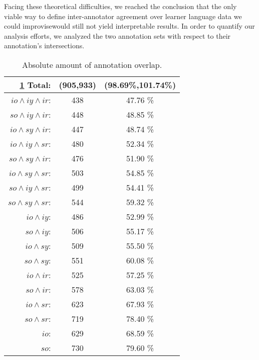 \documentclass[12pt]{article}
\begin{document}
Facing these theoretical difficulties, we reached the conclusion that the only
viable way to define inter-annotator agreement over learner language data
we could improvise\footnotemark would still not yield interpretable results. In
order to quantify our analysis efforts, we analyzed the two annotation sets with
respect to their annotation's intersections.


\begin{table}
  \centering
\begin{tabular}{r|c|c}\ref{tab:1}
  Total: & (905,933)& (98.69\%,101.74\%)\\\hline
  $io \wedge iy \wedge ir$:& 438 & 47.76 \%\\
  $so \wedge iy \wedge ir$:& 448 & 48.85 \%\\
  $io \wedge sy \wedge ir$:& 447 & 48.74 \%\\
  $io \wedge iy \wedge sr$:& 480 & 52.34 \%\\
  $so \wedge sy \wedge ir$:& 476 & 51.90 \%\\
  $io \wedge sy \wedge sr$:& 503 & 54.85 \%\\
  $so \wedge iy \wedge sr$:& 499 & 54.41 \%\\
  $so \wedge sy \wedge sr$:& 544 & 59.32 \%\\
  $     io \wedge iy$:& 486      & 52.99 \%\\
  $     so \wedge iy$:& 506      & 55.17 \%\\
  $     io \wedge sy$:& 509      & 55.50 \%\\
  $     so \wedge sy$:& 551      & 60.08 \%\\
  $     io \wedge ir$:& 525      & 57.25 \%\\
  $     so \wedge ir$:& 578      & 63.03 \%\\
  $     io \wedge sr$:& 623      & 67.93 \%\\
  $     so \wedge sr$:& 719      & 78.40 \%\\
  $          io$:& 629           & 68.59 \%\\
  $          so$:& 730           & 79.60 \%\\
\end{tabular}
\caption{Absolute amount of annotation overlap.}\label{tab:1}

\end{table}
\end{document}
